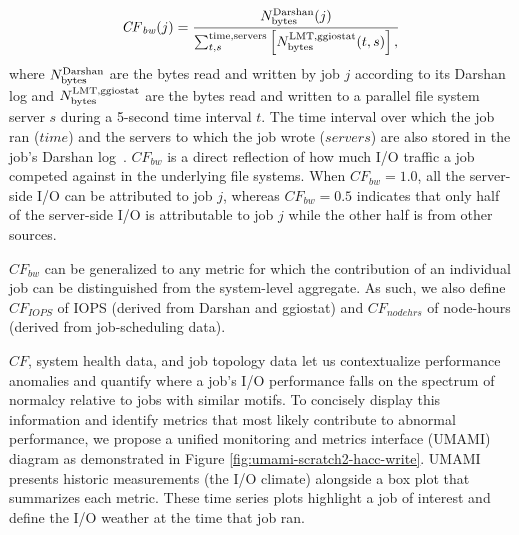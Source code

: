 \begin{equation} \label{eq:cf}
    \mathit{CF}_{\mathit{bw}}(j) = \frac{N_{\textup{bytes}}^{\textup{Darshan}}(j)}
    {\sum_{t,s}^{\textup{time,servers}}
    \left [ N_{\textup{bytes}}^{\textup{LMT,ggiostat}}(t,s) \right ] , }
\end{equation}
%
where 
$N_{\textup{bytes}}^{\textup{Darshan}}$ are the bytes read and written by job $j$ according to its Darshan log and 
$N_{\textup{bytes}}^{\textup{LMT,ggiostat}}$ are the bytes read and written to a parallel file system server $s$ during a 5-second time interval $t$.
The time interval over which the job ran ($\mathit{time}$) and the servers to which the job wrote ($\mathit{servers}$) are also stored in the job's Darshan log~\cite{snyder2016modular}.
$\mathit{CF}_{\mathit{bw}}$ is a direct reflection of how much I/O traffic a job competed against in the underlying file systems.
When $\mathit{CF}_{\mathit{bw}} = 1.0$, all the server-side I/O can be attributed to job $j$, whereas $\mathit{CF}_{\mathit{bw}} = 0.5$ indicates that only half of the server-side I/O is attributable to job $j$ while the other half is from other sources.

$\mathit{CF}_{\mathit{bw}}$ can be generalized to any metric for which the contribution of an individual job can be distinguished from the system-level aggregate.
As such, we also define $\mathit{CF}_{\mathit{IOPS}}$ of IOPS (derived from Darshan and ggiostat) and $\mathit{CF}_{\mathit{nodehrs}}$ of node-hours (derived from job-scheduling data).


$\mathit{CF}$, system health data, and job topology data let us contextualize performance anomalies and quantify where a job's I/O performance falls on the spectrum of normalcy relative to jobs with similar motifs.
To concisely display this information and identify metrics that most likely contribute to abnormal performance, we propose a unified monitoring and metrics interface (UMAMI) diagram as demonstrated in Figure \ref{fig:umami-scratch2-hacc-write}.
UMAMI presents historic measurements (the I/O climate) alongside a box plot that summarizes each metric.
These time series plots highlight a job of interest and define the I/O weather at the time that job ran.

